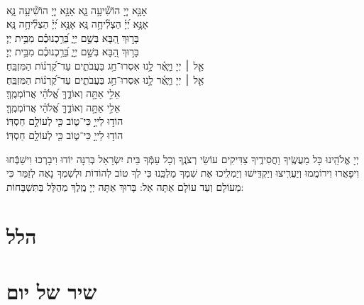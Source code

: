 \documentclass[twoside, openany, parskip=half, 11pt]{book}
\begin{document}
{		
		\\
		אָנָּ֣א יְיָ֭ הוֹשִׁ֘יעָ֥ה נָּ֑א \hfill \scriptsize{אָנָּ֣א יְיָ֭ הוֹשִׁ֘יעָ֥ה נָּ֑א}\\ \normalsize
		אָנָּ֥א יְ֝יָ֗ הַצְלִ֘יחָ֥ה נָּֽא \hfill \scriptsize{ אָנָּ֥א יְ֝יָ֗ הַצְלִ֘יחָ֥ה נָּֽא׃}\\ \normalsize
		בָּר֣וּךְ הַ֭בָּא בְּשֵׁ֣ם יְיָ֑  בֵּ֝רַ֥כְנוּכֶ֗ם מִבֵּ֥ית יְיָ׃\\
		\scriptsize{בָּר֣וּךְ הַ֭בָּא בְּשֵׁ֣ם יְיָ֑ בֵּ֝רַ֥כְנוּכֶ֗ם מִבֵּ֥ית יְיָ׃}\\
		\normalsize{אֵ֤ל ׀ יְיָ וַיָּ֢אֶ֫ר לָ֥נוּ אִסְרוּ־חַ֥ג בַּעֲבֹתִ֑ים עַד־קַ֝רְנ֗וֹת הַמִּזְבֵּֽחַ׃}\\
		\scriptsize{אֵ֤ל ׀ יְיָ וַיָּ֢אֶ֫ר לָ֥נוּ אִסְרוּ־חַ֥ג בַּעֲבֹתִ֑ים עַד־קַ֝רְנ֗וֹת הַמִּזְבֵּֽחַ׃}\\
		\normalsize{אֵלִ֣י אַתָּ֣ה וְאוֹדֶ֑ךָּ אֱ֝לֹהַ֗י אֲרוֹמְמֶֽךָּ׃}\\
		\scriptsize{אֵלִ֣י אַתָּ֣ה וְאוֹדֶ֑ךָּ אֱ֝לֹהַ֗י אֲרוֹמְמֶֽךָּ׃}\\
		\normalsize{הוֹד֣וּ לַייָ֣ כִּי־ט֑וֹב כִּ֖י לְעוֹלָ֣ם חַסְדּֽוֹ׃ }\\
		\scriptsize{הוֹד֣וּ לַייָ֣ כִּי־ט֑וֹב כִּ֖י לְעוֹלָ֣ם חַסְדּֽוֹ׃ } \\
		\normalsize{}
		

	
	\negline
	
	יְיָ אֱלֹהֵֽינוּ כָּל מַעֲשֶֽׂיךָ וַחֲסִידֶֽיךָ צַדִּיקִים עוֹשֵׂי רְצֹנֶֽךָ וְכָל עַמְּֿךָ בֵּית יִשְׂרָאֵל בְּרִנָּה יוֹדוּ וִיבָרְכוּ וִישַׁבְּֿחוּ וִיפָאֲרוּ וִירוֹמֲמוּ וְיַעֲרִֽיצוּ וְיַקְדִּֽישׁוּ וְיַמְלִֽיכוּ אֶת שִׁמְךָ מַלְכֵּֽנוּ  כִּי לְךָ טוֹב לְהוֹדוֹת וּלְשִׁמְךָ נָאֶה לְזַמֵּר כִּי מֵעוֹלָם וְעַד עוֹלָם אַתָּה אֵל: בָּרוּךְ אַתָּה יְיָ מֶֽלֶךְ מְהֻלָּל בַּתִּשְׁבָּחוֹת:
}

\label{hallel}
\section[הלל‎]{ הלל‎ }
	\hallel{\shatz}


\vfill
\label{shacharitShabbatYTtitkabel}
\fullkaddish
\section[שיר של יום]{ שיר של יום‎ }
\weekdayshir
\end{document}
